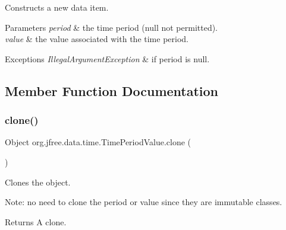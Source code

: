 Constructs a new data item.


\begin{DoxyParams}{Parameters}
{\em period} & the time period ({\ttfamily null} not permitted). \\
\hline
{\em value} & the value associated with the time period.\\
\hline
\end{DoxyParams}

\begin{DoxyExceptions}{Exceptions}
{\em Illegal\+Argument\+Exception} & if {\ttfamily period} is {\ttfamily null}. \\
\hline
\end{DoxyExceptions}


\subsection{Member Function Documentation}
\mbox{\label{classorg_1_1jfree_1_1data_1_1time_1_1_time_period_value_aebd9057a9710b15ab679996333dc0b32}} 
\subsubsection{\texorpdfstring{clone()}{clone()}}
{\footnotesize\ttfamily Object org.\+jfree.\+data.\+time.\+Time\+Period\+Value.\+clone (\begin{DoxyParamCaption}{ }\end{DoxyParamCaption})}

Clones the object. 

Note\+: no need to clone the period or value since they are immutable classes.

\begin{DoxyReturn}{Returns}
A clone. 
\end{DoxyReturn}
\mbox{\label{classorg_1_1jfree_1_1data_1_1time_1_1_time_period_value_afbd023fb8ba6b764ba2d866adab5977f}} 
